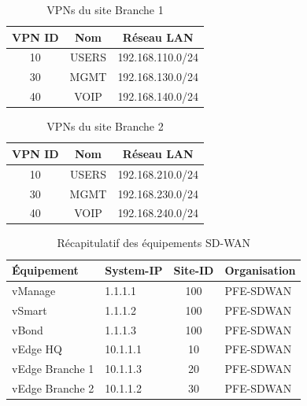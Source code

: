 \documentclass[12pt,a4paper,oneside]{report}
\begin{document}
	
	\begin{table}[H]
		\centering
		\caption{VPNs du site Branche 1}
		\label{tab:vpn-b1}
		
		\begin{tabular}{|c|c|c|}
			\hline
			\textbf{VPN ID} & \textbf{Nom} & \textbf{Réseau LAN} \\
			\hline
			10 & USERS & 192.168.110.0/24 \\
			\hline
			30 & MGMT & 192.168.130.0/24 \\
			\hline
			40 & VOIP & 192.168.140.0/24 \\
			\hline
		\end{tabular}
	\end{table}
	
	
	\begin{table}[H]
		\centering
		\caption{VPNs du site Branche 2}
		\label{tab:vpn-b2}
		
		\begin{tabular}{|c|c|c|}
			\hline
			\textbf{VPN ID} & \textbf{Nom} & \textbf{Réseau LAN} \\
			\hline
			10 & USERS & 192.168.210.0/24 \\
			\hline
			30 & MGMT & 192.168.230.0/24 \\
			\hline
			40 & VOIP & 192.168.240.0/24 \\
			\hline
		\end{tabular}
	\end{table}
	
	
	\begin{table}[H]
		\centering
		\caption{Récapitulatif des équipements SD-WAN}
		\label{tab:sdwan-summary}
		
		\begin{tabular}{|l|l|c|l|}
			\hline
			\textbf{Équipement} & \textbf{System-IP} & \textbf{Site-ID} & \textbf{Organisation} \\
			\hline
			vManage & 1.1.1.1 & 100 & PFE-SDWAN \\
			\hline
			vSmart & 1.1.1.2 & 100 & PFE-SDWAN \\
			\hline
			vBond & 1.1.1.3 & 100 & PFE-SDWAN \\
			\hline
			vEdge HQ & 10.1.1.1 & 10 & PFE-SDWAN \\
			\hline
			vEdge Branche 1 & 10.1.1.3 & 20 & PFE-SDWAN \\
			\hline
			vEdge Branche 2 & 10.1.1.2 & 30 & PFE-SDWAN \\
			\hline
		\end{tabular}
	\end{table}
\end{document}
